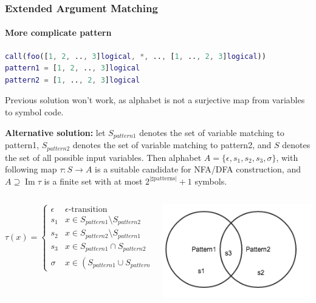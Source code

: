 \documentclass[10pt]{beamer}
\DeclareMathOperator{\Ima}{Im}
\begin{document}
\begin{frame}[fragile]
\frametitle{Extended Argument Matching}
\framesubtitle{More complicate pattern}
\begin{lstlisting}[basicstyle=\small, language=MATLAB]
call(foo([1, 2, .., 3]logical, *, .., [1, .., 2, 3]logical))
pattern1 = [1, 2, .., 3]logical
pattern2 = [1, .., 2, 3]logical
\end{lstlisting}
Previous solution won't work, as alphabet is not a surjective map from
variables to symbol code.

\textbf{Alternative solution:}
let $S_{pattern1}$ denotes the set of variable matching to pattern1, 
$S_{pattern2}$ denotes the set of variable matching to pattern2, and $S$
denotes the set of all possible input variables. Then alphabet $A =
\lbrace \epsilon, s_1, s_2, s_3, \sigma \rbrace$, with following map $\tau : S
\rightarrow A$ is a suitable candidate for NFA/DFA construction, and
$A \supseteq \Ima \tau$ is a finite set with at most $2^{\vert \sharp
\text{patterns}
\vert} + 1$ symbols.                                                         \\

\begin{columns}
\begin{column}[T]{0.5\textwidth}
\begin{equation*}
    \tau(x) = 
         \begin{cases}
            \epsilon       &\epsilon \text{-transition}                      \\
            s_1            &x \in S_{pattern1} \setminus S_{pattern2}        \\
            s_2            &x \in S_{pattern2} \setminus S_{pattern1}        \\
            s_3            &x \in S_{pattern1} \cap S_{pattern2}             \\
            \sigma         &x \in (S_{pattern1} \cup S_{pattern2})^{\mathsf{c}}
        \end{cases}
\end{equation*}
\end{column}
\begin{column}[T]{0.5\textwidth}
\includegraphics[scale=0.5]{vangraph}    
\end{column}

    
\end{columns}

\end{frame}
\end{document}
